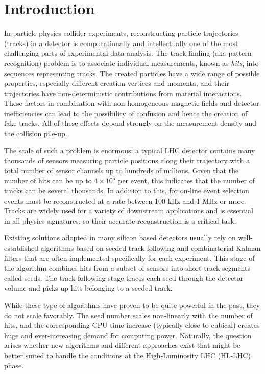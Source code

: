 
\chapter{Introduction}

\setlength\parindent{0pt}

In particle physics collider experiments, reconstructing particle trajectories (tracks) in a detector is computationally and intellectually one of the most challenging parts of experimental data analysis. The track finding (aka pattern recognition) problem is to associate individual measurements, known as \textit{hits}, into sequences representing tracks. The created particles have a wide range of possible properties, especially different creation vertices and momenta, and their trajectories have non-deterministic contributions from material interactions. These factors in combination with non-homogeneous magnetic fields and detector inefficiencies can lead to the possibility of confusion and hence the creation of fake tracks. All of these effects depend strongly on the measurement density and the collision pile-up.

The scale of such a problem is enormous; a typical LHC detector contains many thousands of sensors measuring particle positions along their trajectory with a total number of sensor channels up to hundreds of millions. Given that the number of hits can be up to $4 \times 10^{5}$ per event, this indicates that the number of tracks can be several thousands. In addition to this, for on-line event selection events must be reconstructed at a rate between 100 kHz and 1 MHz or more. Tracks are widely used for a variety of downstream applications and is essential in all physics signatures, so their accurate reconstruction is a critical task.   

Existing solutions adopted in many silicon based detectors usually rely on well-established algorithms based on seeded track following and combinatorial Kalman filters \cite{AGOSTINELLI2003250} that are often implemented specifically for each experiment. This stage of the algorithm combines hits from a subset of sensors into short track segments called seeds. The track following stage traces each seed through the detector volume and picks up hits belonging to a seeded track.

While these type of algorithms have proven to be quite powerful in the past, they do not scale favorably. The seed number scales non-linearly with the number of hits, and the corresponding CPU time increase (typically close to cubical) creates huge and ever-increasing demand for computing power. Naturally, the question arises whether new algorithms and different approaches exist that might be better suited to handle the conditions at the High-Luminosity LHC (HL-LHC) phase.

